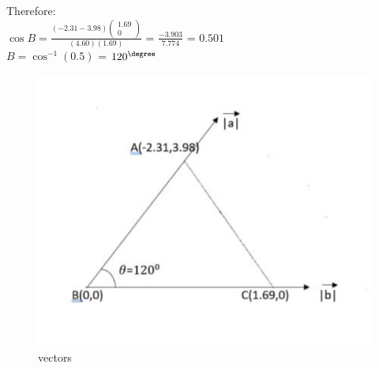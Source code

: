 \documentclass[12pt]{article}
\providecommand{\brak}[1]{\ensuremath{\left(#1\right)}}
\newcommand{\myvec}[1]{\ensuremath{\begin{pmatrix}#1\end{pmatrix}}}
\begin{document}
\begin{enumerate}
Therefore:\\
$\cos{B}=\frac{\brak{{-2.31}-{3.98}}{\myvec{1.69\\0}}}{\brak{4.60}\brak{1.69}}$ = $\frac{-3.903}{7.774}$ = ${0.501}$\\

$ {B}=\cos^{-1}\brak{0.5}$ = $120^\degree$

 \begin{figure}[!h]
        \centering
        \includegraphics[width=\columnwidth]{math.jpeg}
        \caption{vectors}
        \label{fig:figure}
    \end{figure}
  \end{enumerate}
\end{document}
